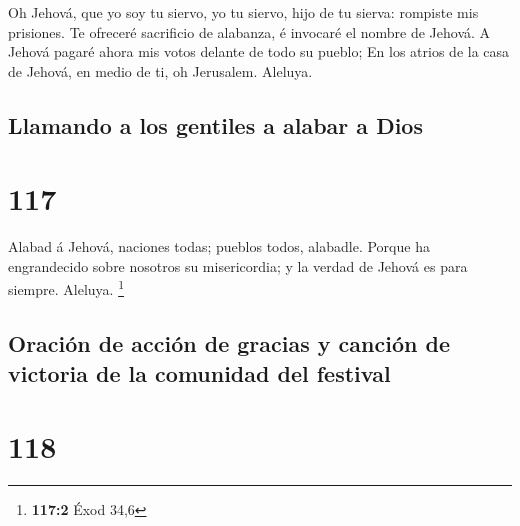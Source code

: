  Oh Jehová, que yo soy tu siervo, yo tu siervo, hijo de tu
sierva: rompiste mis prisiones.  Te ofreceré sacrificio de
alabanza, é invocaré el nombre de Jehová.  A Jehová pagaré
ahora mis votos delante de todo su pueblo;  En los atrios
de la casa de Jehová, en medio de ti, oh Jerusalem. Aleluya.

\hypertarget{llamando-a-los-gentiles-a-alabar-a-dios}{%
\subsection{Llamando a los gentiles a alabar a
Dios}\label{llamando-a-los-gentiles-a-alabar-a-dios}}

\hypertarget{section-116}{%
\section{117}\label{section-116}}

 Alabad á Jehová, naciones todas; pueblos todos, alabadle.
 Porque ha engrandecido sobre nosotros su misericordia; y la
verdad de Jehová es para siempre. Aleluya. \footnote{\textbf{117:2} Éxod
  34,6}

\hypertarget{oraciuxf3n-de-acciuxf3n-de-gracias-y-canciuxf3n-de-victoria-de-la-comunidad-del-festival}{%
\subsection{Oración de acción de gracias y canción de victoria de la
comunidad del
festival}\label{oraciuxf3n-de-acciuxf3n-de-gracias-y-canciuxf3n-de-victoria-de-la-comunidad-del-festival}}

\hypertarget{section-117}{%
\section{118}\label{section-117}}

